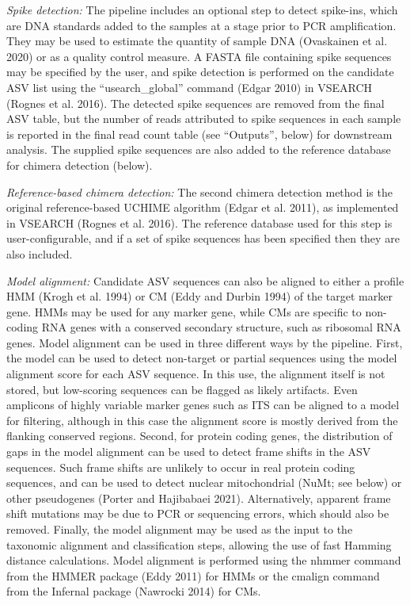 \documentclass[
]{article}
\begin{document}
\emph{Spike detection:}
The pipeline includes an optional step to detect spike-ins, which are DNA standards added to the samples at a stage prior to PCR amplification.
They may be used to estimate the quantity of sample DNA (Ovaskainen et al. 2020) or as a quality control measure.
A FASTA file containing spike sequences may be specified by the user, and spike detection is performed on the candidate ASV list using the ``usearch\_global'' command (Edgar 2010) in VSEARCH (Rognes et al. 2016).
The detected spike sequences are removed from the final ASV table, but the number of reads attributed to spike sequences in each sample is reported in the final read count table (see ``Outputs'', below) for downstream analysis.
The supplied spike sequences are also added to the reference database for chimera detection (below).

\emph{Reference-based chimera detection:}
The second chimera detection method is the original reference-based UCHIME algorithm (Edgar et al. 2011), as implemented in VSEARCH (Rognes et al. 2016).
The reference database used for this step is user-configurable, and if a set of spike sequences has been specified then they are also included.

\emph{Model alignment:}
Candidate ASV sequences can also be aligned to either a profile HMM (Krogh et al. 1994) or CM (Eddy and Durbin 1994) of the target marker gene.
HMMs may be used for any marker gene, while CMs are specific to non-coding RNA genes with a conserved secondary structure, such as ribosomal RNA genes.
Model alignment can be used in three different ways by the pipeline.
First, the model can be used to detect non-target or partial sequences using the model alignment score for each ASV sequence.
In this use, the alignment itself is not stored, but low-scoring sequences can be flagged as likely artifacts.
Even amplicons of highly variable marker genes such as ITS can be aligned to a model for filtering, although in this case the alignment score is mostly derived from the flanking conserved regions.
Second, for protein coding genes, the distribution of gaps in the model alignment can be used to detect frame shifts in the ASV sequences.
Such frame shifts are unlikely to occur in real protein coding sequences, and can be used to detect nuclear mitochondrial (NuMt; see below) or other pseudogenes (Porter and Hajibabaei 2021).
Alternatively, apparent frame shift mutations may be due to PCR or sequencing errors, which should also be removed.
Finally, the model alignment may be used as the input to the taxonomic alignment and classification steps, allowing the use of fast Hamming distance calculations.
Model alignment is performed using the nhmmer command from the HMMER package (Eddy 2011) for HMMs or the cmalign command from the Infernal package (Nawrocki 2014) for CMs.
\end{document}

